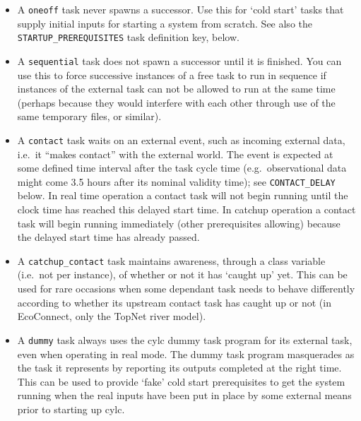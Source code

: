 \documentclass[11pt,a4paper]{article}
\begin{document}
\begin{itemize}
    \item A \lstinline=oneoff= task never spawns a successor. Use this for 
        `cold start' tasks that supply initial inputs for starting a
        system from scratch.  See also the
        \lstinline=STARTUP_PREREQUISITES=
        task definition key, below.

    \item A \lstinline=sequential= task does not spawn a successor until it is
        finished. You can use this to force successive instances of a
        free task to run in sequence if instances of the external task
        can not be allowed to run at the same time (perhaps because they
        would interfere with each other through use of the same
        temporary files, or similar).

    \item A \lstinline=contact= task waits on an external event, such as
        incoming external data, i.e.\ it ``makes contact'' with the
        external world.  The event is expected at some defined time
        interval after the task cycle time (e.g.\ observational data
        might come 3.5 hours after its nominal validity time); see
        \lstinline=CONTACT_DELAY= below. In real time operation a contact task will
        not begin running until the clock time has reached this delayed
        start time. In catchup operation a contact task will begin
        running immediately (other prerequisites allowing) because the
        delayed start time has already passed.  
        
    \item A \lstinline=catchup_contact= task maintains awareness,
        through a class variable (i.e.\ not per instance), of whether or
        not it has `caught up' yet.  This can be used for rare occasions
        when some dependant task needs to behave differently according
        to whether its upstream contact task has caught up or not (in
        EcoConnect, only the TopNet river model).

    \item A \lstinline=dummy= task always uses the cylc dummy task
        program for its external task, even when operating in real mode.
        The dummy task program masquerades as the task it represents by
        reporting its outputs completed at the right time. This can be
        used to provide `fake' cold start prerequisites to get the
        system running when the real inputs have been put in place by
        some external means prior to starting up cylc.

\end{itemize}
\end{document}
